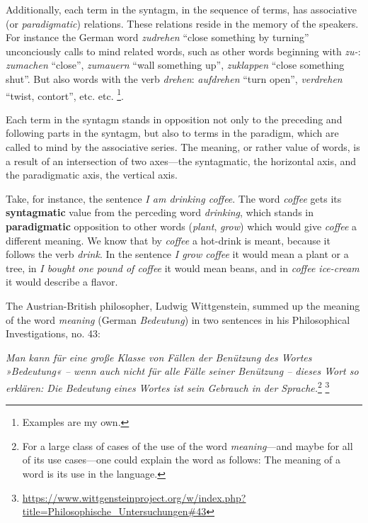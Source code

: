 Additionally, each term in the syntagm, in the sequence of terms, has associative (or \emph{paradigmatic}) relations. 
These relations reside in the memory of the speakers. 
For instance the German word \emph{zudrehen} \enquote{close something by turning} unconciously calls to mind related words, such as other words beginning with \emph{zu-}: \emph{zumachen} \enquote{close}, \emph{zumauern} \enquote{wall something up}, \emph{zuklappen} \enquote{close something shut}. 
But also words with the verb \emph{drehen}: \emph{aufdrehen} \enquote{turn open}, \emph{verdrehen} \enquote{twist, contort}, etc. etc. \autocite[122-127]{de-saussure-1959-course}\footnote{Examples are my own.}.

Each term in the syntagm stands in opposition not only to the preceding and following parts in the syntagm, but also to terms in the paradigm, which are called to mind by the associative series. 
The meaning, or rather value of words, is a result of an intersection of two axes---the syntagmatic, the horizontal axis, and the paradigmatic axis, the vertical axis.

Take, for instance, the sentence \emph{I am drinking coffee}. The word \emph{coffee} gets its  \textbf{syntagmatic} value from the perceding word \emph{drinking}, which stands in \textbf{paradigmatic} opposition to other words (\emph{plant}, \emph{grow}) which would give \emph{coffee} a different meaning.
We know that by \emph{coffee} a hot-drink is meant, because it follows the verb \emph{drink}. In the sentence \emph{I grow coffee} it would mean a plant or a tree, in \emph{I bought one pound of coffee} it would mean beans, and in \emph{coffee ice-cream} it would describe a flavor.

The Austrian-British philosopher, Ludwig Wittgenstein, summed up the meaning of the word \emph{meaning} (German \emph{Bedeutung}) in two sentences in his Philosophical Investigations, no. 43:


\begin{displayquote}\emph{
Man kann für eine große Klasse von Fällen der Benützung des Wortes »Bedeutung« – wenn auch nicht für alle Fälle seiner Benützung – dieses Wort so erklären: Die Bedeutung eines Wortes ist sein Gebrauch in der Sprache.}\footnote{{For a large class of cases of the use of the word \emph{meaning}---and maybe for all of its use cases---one could explain the word as follows: The meaning of a word is its use in the language.}} { \footnote{\url{https://www.wittgensteinproject.org/w/index.php?title=Philosophische_Untersuchungen\#43}}}
\end{displayquote}


